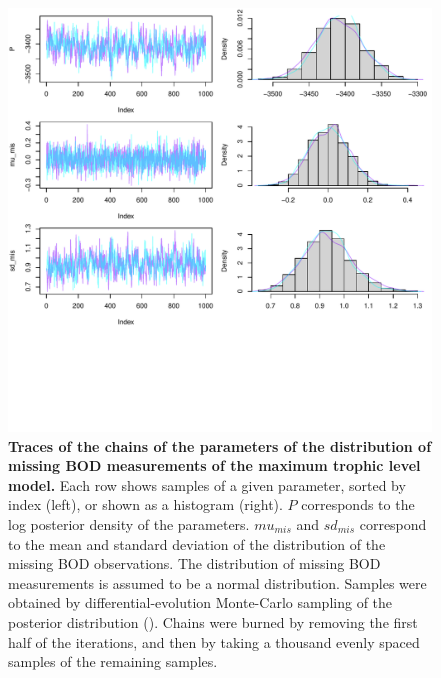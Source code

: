\documentclass[11pt, oneside]{article}
\begin{document}
\begin{figure}[H]
\begin{center}
\includegraphics[page=1, width=1\linewidth]{b0_6_2/out_mTL/fig_tracePlot_sd_mis.pdf}
\caption{
    \textbf{Traces of the chains of the parameters of the distribution of missing BOD measurements of the maximum trophic level model.}
    Each row shows samples of a given parameter, sorted by index (left), or shown as a histogram (right).
    $P$ corresponds to the log posterior density of the parameters.
    $mu_{mis}$ and $sd_{mis}$ correspond to the mean and standard deviation of the distribution of the missing BOD observations.
    The distribution of missing BOD measurements is assumed to be a normal distribution.
    Samples were obtained by differential-evolution Monte-Carlo sampling of the posterior distribution (\cite{TerBraak2006}).
    Chains were burned by removing the first half of the iterations, and then by taking a thousand evenly spaced samples of the remaining samples.
} 
\end{center}
\end{figure}

%

\printbibliography
\end{document}
